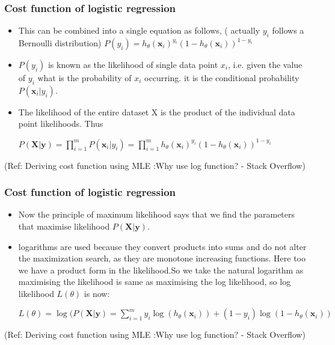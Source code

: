 \begin{frame}[fragile]\frametitle{Cost function of logistic regression}
\begin{itemize}
\item This can be combined into a single equation as follows, ( actually $y_i$ follows a Bernoulli distribution)
$P(y_i ) = h_{\theta}(\mathbf{x}_i)^{y_i} (1 - h_{\theta}(\mathbf{x}_i))^{1-y_i}$
\item $P(y_i)$ is known as the likelihood of single data point $x_i$, i.e. given the value of $y_i$ what is the probability of $x_i$ occurring. it is the conditional probability $P(\mathbf{x}_i | y_i)$.
\item The likelihood of the entire dataset X is the product of the individual data point likelihoods. Thus

$P(\mathbf{X}|\mathbf{y}) = \prod_{i=1}^{m} P(\mathbf{x}_i | y_i) = \prod_{i=1}^{m} h_{\theta}(\mathbf{x}_i)^{y_i} (1 - h_{\theta}(\mathbf{x}_i))^{1-y_i}$
\end{itemize}

{\tiny (Ref: Deriving cost function using MLE :Why use log function? - Stack Overflow)}
\end{frame}

\begin{frame}[fragile]\frametitle{Cost function of logistic regression}
\begin{itemize}
\item Now the principle of maximum likelihood says that we find the parameters that maximise likelihood $P(\mathbf{X}|\mathbf{y})$.
\item logarithms are used because they convert products into sums and do not alter the maximization search, as they are monotone increasing functions. Here too we have a product form in the likelihood.So we take the natural logarithm as maximising the likelihood is same as maximising the log likelihood, so log likelihood $L(\theta)$ is now:

$L(\theta) = \log(P(\mathbf{X}|\mathbf{y}) =  \sum_{i=1}^{m} y_i \log(h_{\theta}(\mathbf{x}_i)) + (1-y_i) \log(1 - h_{\theta}(\mathbf{x}_i))$
\end{itemize}

{\tiny (Ref: Deriving cost function using MLE :Why use log function? - Stack Overflow)}
\end{frame}

